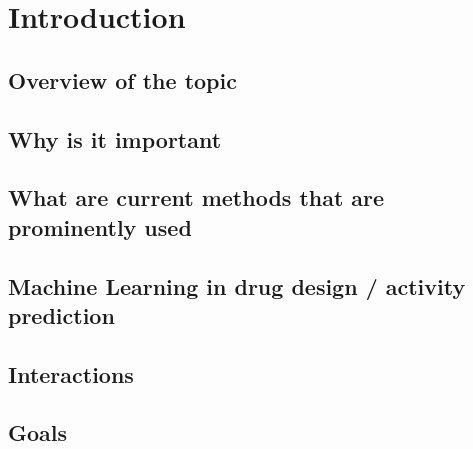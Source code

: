 \chapter{Introduction}
\label{cha:Introduction}



\section {Overview of the topic}
\section {Why is it important}
\section {What are current methods that are prominently used}
\section {Machine Learning in drug design / activity prediction}
\section {Interactions}
\section {Goals}

